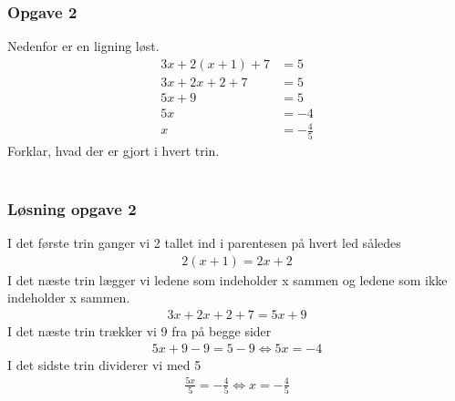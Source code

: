 \subsubsection{Opgave 2}

Nedenfor er en ligning løst.
\begin{align*}
    3x + 2(x+1) + 7 &= 5\\
    3x + 2x + 2 + 7 &= 5\\
    5x + 9 &= 5\\
    5x &= -4\\
    x &= -\frac{4}{5}
\end{align*}
Forklar, hvad der er gjort i hvert trin.\\\\

\subsubsection*{Løsning opgave 2}
I det første trin ganger vi 2 tallet ind i parentesen på hvert led således 
\begin{align*}
    2(x + 1)=2x + 2
\end{align*}
I det næste trin lægger vi ledene som indeholder x sammen og ledene som ikke indeholder x sammen.
\begin{align*}
    3x + 2x +2 +7 = 5x + 9
\end{align*}
I det næste trin trækker vi 9 fra på begge sider
\begin{align*}
    5x + 9 - 9 = 5 - 9 \Longleftrightarrow 5x = -4
\end{align*}
I det sidste trin dividerer vi med 5 
\begin{align*}
    \frac{5x}{5} = -\frac{4}{5} \Longleftrightarrow x = -\frac{4}{5}
\end{align*}
